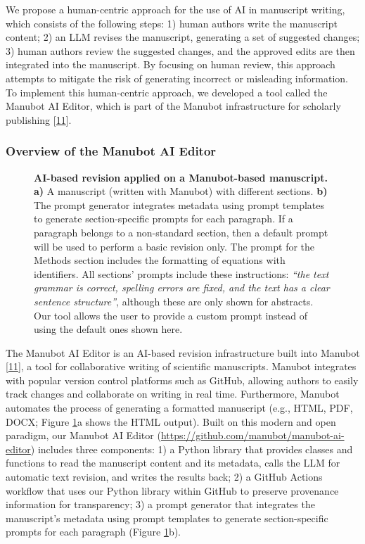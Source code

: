 \documentclass[
]{article}
\begin{document}
We propose a human-centric approach for the use of AI in manuscript writing, which consists of the following steps:
1) human authors write the manuscript content;
2) an LLM revises the manuscript, generating a set of suggested changes;
3) human authors review the suggested changes, and the approved edits are then integrated into the manuscript.
By focusing on human review, this approach attempts to mitigate the risk of generating incorrect or misleading information.
To implement this human-centric approach, we developed a tool called the Manubot AI Editor, which is part of the Manubot infrastructure for scholarly publishing {[}\protect\hyperlink{ref-YuJbg3zO}{11}{]}.

\hypertarget{overview-of-the-manubot-ai-editor}{%
\subsubsection{Overview of the Manubot AI Editor}\label{overview-of-the-manubot-ai-editor}}

\begin{figure}
\hypertarget{fig:ai_revision}{%
\centering

\caption{\textbf{AI-based revision applied on a Manubot-based manuscript.}
\textbf{a)} A manuscript (written with Manubot) with different sections.
\textbf{b)} The prompt generator integrates metadata using prompt templates to generate section-specific prompts for each paragraph.
If a paragraph belongs to a non-standard section, then a default prompt will be used to perform a basic revision only.
The prompt for the Methods section includes the formatting of equations with identifiers.
All sections' prompts include these instructions: \emph{``the text grammar is correct, spelling errors are fixed, and the text has a clear sentence structure''}, although these are only shown for abstracts.
Our tool allows the user to provide a custom prompt instead of using the default ones shown here.}\label{fig:ai_revision}
}
\end{figure}

The Manubot AI Editor is an AI-based revision infrastructure built into Manubot {[}\protect\hyperlink{ref-YuJbg3zO}{11}{]}, a tool for collaborative writing of scientific manuscripts.
Manubot integrates with popular version control platforms such as GitHub, allowing authors to easily track changes and collaborate on writing in real time.
Furthermore, Manubot automates the process of generating a formatted manuscript (e.g., HTML, PDF, DOCX; Figure \ref{fig:ai_revision}a shows the HTML output).
Built on this modern and open paradigm, our Manubot AI Editor (\url{https://github.com/manubot/manubot-ai-editor}) includes three components:
1) a Python library that provides classes and functions to read the manuscript content and its metadata, calls the LLM for automatic text revision, and writes the results back;
2) a GitHub Actions workflow that uses our Python library within GitHub to preserve provenance information for transparency;
3) a prompt generator that integrates the manuscript's metadata using prompt templates to generate section-specific prompts for each paragraph (Figure \ref{fig:ai_revision}b).
\end{document}
